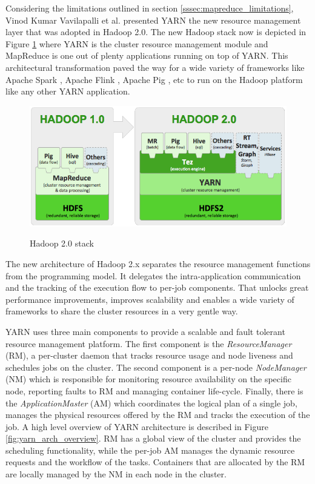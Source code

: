 Considering the limitations outlined in section
\ref{sssec:mapreduce_limitations}, Vinod Kumar Vavilapalli et
al. presented YARN \cite{Vavilapalli:2013:AHY:2523616.2523633} the new
resource management layer that was adopted in Hadoop 2.0. The new
Hadoop stack now is depicted in Figure \ref{fig:yarn_hadoop1_hadoop2_arch} where YARN is the
cluster resource management module and MapReduce is one out of plenty
applications running on top of YARN. This architectural transformation
paved the way for a wide variety of frameworks like
Apache Spark \cite{apache_spark}, Apache Flink \cite{apache_flink},
Apache Pig \cite{apache_pig}, etc to run on the
Hadoop platform like any other YARN application.

\begin{figure}
\centering
\includegraphics[scale=0.6]{resources/images/Background/hadoop1_hadoop2_arch.png}
\label{fig:yarn_hadoop1_hadoop2_arch}
\caption{Hadoop 2.0 stack \cite{hortonworks_hadoop_stack}}
\end{figure}

The new architecture of Hadoop 2.x separates the resource management
functions from the programming model. It delegates the
intra-application communication and the tracking of the execution flow
to per-job components. That unlocks great performance improvements,
improves scalability and enables a wide variety of frameworks to share
the cluster resources in a very gentle way.

YARN uses three main components to provide a scalable and fault
tolerant resource management platform. The first component is the
\emph{ResourceManager} (RM), a per-cluster daemon that tracks resource
usage and node liveness and schedules jobs on the cluster. The second
component is a per-node \emph{NodeManager} (NM) which is responsible
for monitoring resource availability on the specific node, reporting
faults to RM and managing container life-cycle. Finally, there is the
\emph{ApplicationMaster} (AM) which coordinates the logical plan of a
single job, manages the physical resources offered by the RM and
tracks the execution of the job. A high level overview of YARN
architecture is described in Figure \ref{fig:yarn_arch_overview}. RM
has a global view of the cluster and provides the scheduling
functionality, while the per-job AM manages the dynamic resource
requests and the workflow of the tasks. Containers that are allocated
by the RM are locally managed by the NM in each node in the cluster.

